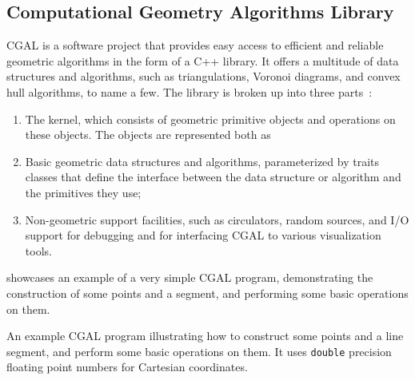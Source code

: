 \subsection{Computational Geometry Algorithms Library}%
\label{sec:solution.impl.cgal}

\Ac{CGAL} is a software project that provides easy access to efficient and
reliable geometric algorithms in the form of a C++ library.  It offers a
multitude of data structures and algorithms, such as triangulations, Voronoi
diagrams, and convex hull algorithms, to name a few.  The library is broken up
into three parts~\cite{CGAL:5.3:23LGK}:
\begin{enumerate}
  \item The kernel, which consists of geometric primitive objects and operations
  on these objects.  The objects are represented both as
  \item Basic geometric data structures and algorithms, parameterized by traits
  classes that define the interface between the data structure or algorithm and
  the primitives they use;
  \item Non-geometric support facilities, such as circulators, random sources,
  and I/O support for debugging and for interfacing \ac{CGAL} to various
  visualization tools.
\end{enumerate}

 showcases an example of a very simple
\ac{CGAL} program, demonstrating the construction of some points and a segment,
and performing some basic operations on them.

\begin{listing}[htbp]
  \caption[CGAL: Three points and one segment]{
    An example CGAL program illustrating how to construct some points and a line
    segment, and perform some basic operations on them.  It uses
    \texttt{double} precision floating point numbers for Cartesian
    coordinates.}\label{lst:solution.impl.cgal.pas}
  \inputminted{cpp}{cpp/points_and_segments.cpp}
\end{listing}

